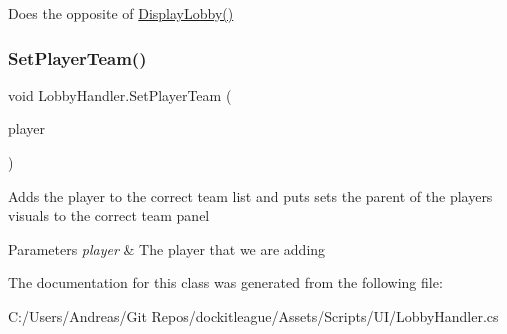 Does the opposite of \hyperlink{class_lobby_handler_a93e035e5597d004874101d1f5cdccddb}{Display\+Lobby()} 

\hypertarget{class_lobby_handler_ab08c8184e14aca2579503c6201af7e10}{}\label{class_lobby_handler_ab08c8184e14aca2579503c6201af7e10} 
\subsubsection{\texorpdfstring{Set\+Player\+Team()}{SetPlayerTeam()}}
{\footnotesize\ttfamily void Lobby\+Handler.\+Set\+Player\+Team (\begin{DoxyParamCaption}\item[{\hyperlink{class_d_l_network_lobby_player}{D\+L\+Network\+Lobby\+Player}}]{player }\end{DoxyParamCaption})}



Adds the player to the correct team list and puts sets the parent of the player\textquotesingle{}s visuals to the correct team panel 


\begin{DoxyParams}{Parameters}
{\em player} & The player that we are adding\\
\hline
\end{DoxyParams}


The documentation for this class was generated from the following file\+:\begin{DoxyCompactItemize}
\item 
C\+:/\+Users/\+Andreas/\+Git Repos/dockitleague/\+Assets/\+Scripts/\+U\+I/Lobby\+Handler.\+cs\end{DoxyCompactItemize}
